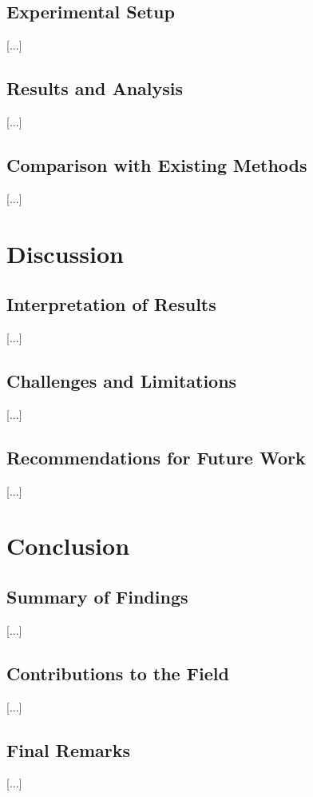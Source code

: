 \documentclass{SGGW-thesis-EN}
\begin{document}
\section{Experimental Setup}
[...]

\section{Results and Analysis}
[...]

\section{Comparison with Existing Methods}
[...]

\chapter{Discussion}

\section{Interpretation of Results}
[...]

\section{Challenges and Limitations}
[...]

\section{Recommendations for Future Work}
[...]

\chapter{Conclusion}

\section{Summary of Findings}
[...]

\section{Contributions to the Field}
[...]

\section{Final Remarks}
[...]
\end{document}
